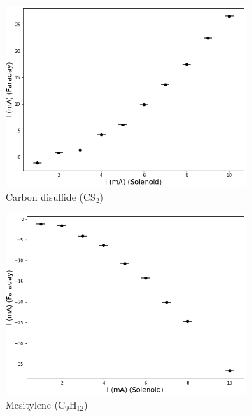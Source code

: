 \documentclass[11pt,a4paper]{article}
\begin{document}
\begin{figure}[H]
\centering
\begin{subfigure}[b]{0.45\textwidth}
\includegraphics[width=\textwidth]{sample3}
\caption{Carbon disulfide (CS$_2$)}
\label{fig:CME_sample3}
\end{subfigure}
\begin{subfigure}[b]{0.45\textwidth}
\includegraphics[width=\textwidth]{sample2}
\caption{Mesitylene (C$_9$H$_{12}$)}
\label{fig:CME_sample2}
\end{subfigure}\\\vspace{.2cm}
\begin{subfigure}[b]{0.45\textwidth}

\end{subfigure}
\end{figure}
\end{document}
